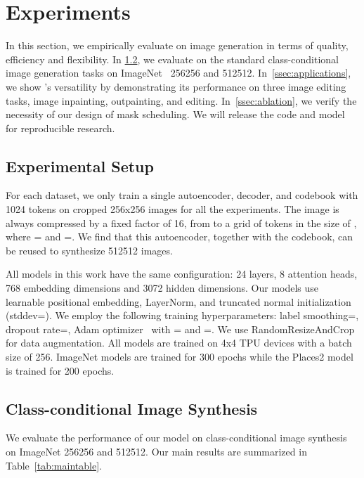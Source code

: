 
\section{Experiments}
\label{sec:experiments}

In this section, we empirically evaluate \model on image generation in terms of quality, efficiency and flexibility.
In \ref{ssec:class_conditional_synthesis}, we evaluate \model on the standard class-conditional image generation tasks on ImageNet~\cite{deng2009imagenet} 256256 and 512512.
In~\ref{ssec:applications}, we show \model's versatility by demonstrating its performance on three image editing tasks, image inpainting, outpainting, and editing. In~\ref{ssec:ablation}, we verify the necessity of our design of mask scheduling. We will release the code and model for reproducible research.


\subsection{Experimental Setup}
\label{ssec:architecture}

For each dataset, we only train a single autoencoder, decoder, and codebook with 1024 tokens on cropped 256x256 images for all the experiments. The image is always compressed by a fixed factor of 16, \ie from  to a grid of tokens in the size of , where = and =. We find that this autoencoder, together with the codebook, can be reused to synthesize 512512 images.

All models in this work have the same configuration: 24 layers, 8 attention heads, 768 embedding dimensions and 3072 hidden dimensions. Our models use learnable positional embedding\cite{Vaswani17attention}, LayerNorm\cite{ba2016layer}, and truncated normal initialization (stddev=). We employ the following training hyperparameters: label smoothing=, dropout rate=, Adam optimizer~\cite{kingma2014adam} with = and =. We use RandomResizeAndCrop for data augmentation. All models are trained on 4x4 TPU devices with a batch size of 256. ImageNet models are trained for 300 epochs while the Places2 model is trained for 200 epochs. 

\subsection{Class-conditional Image Synthesis}
\label{ssec:class_conditional_synthesis}

We evaluate the performance of our model on class-conditional image synthesis on ImageNet 256256 and 512512. Our main results are summarized in Table~\ref{tab:maintable}.

